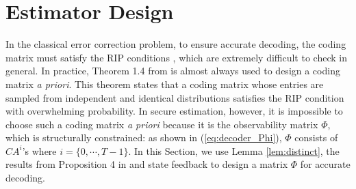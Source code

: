 \documentclass[twocolumn]{autart}    %
\newcommand{\rev}[1]{{\normalsize{{{\color{blue}#1}}}}}
\begin{document}
\section{\rev{Estimator} Design}\label{sec:design}
\vspace{-0.4cm}
In the classical error correction problem, to ensure accurate decoding, the coding matrix must satisfy the RIP conditions  \cite{Candes_Tao}, which are extremely difficult to check in general. In practice, Theorem 1.4 from\cite{Candes_Tao} is almost always used to design a coding matrix {\it a priori}. This theorem states that a coding matrix whose entries are sampled from independent and identical distributions satisfies the RIP condition with overwhelming probability. 
In secure estimation, however, it is impossible to choose such a coding matrix {\it a priori} because it is the observability matrix $\Phi$, which is structurally constrained: as shown in (\ref{eq:decoder_Phi}), $\Phi$ consists of $CA^{i}$'s where $i=\{0, \cdots, T-1\}$. In this Section, we use Lemma \ref{lem:distinct}, the results from Proposition 4 in \cite{Fawzi2014} and state feedback to design a matrix $\Phi$ for accurate decoding. 
\vspace{-0.4cm}
\end{document}
